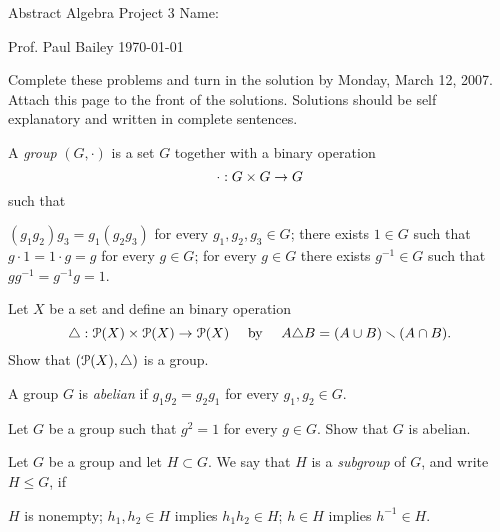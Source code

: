 \documentclass{article}
\begin{document}
{\small {\sc Abstract Algebra}}
\hspace{2 cm}
{\normalsize Project 3}
\hspace{2.4 cm}
{\large Name:}

\noindent
\hspace{2.5 cm}
{\small {\sc Prof. Paul Bailey} }
\hspace{2 cm}
{\normalsize \today}

\vspace{0.5 cm}

Complete these problems and turn in the solution by Monday, March 12, 2007.
Attach this page to the front of the solutions.  Solutions should be self explanatory
and written in complete sentences.

\begin{center}
\end{center}

\begin{Def}
A {\em group} $(G,\cdot)$ is a set $G$ together with a binary operation
\[ \cdot : G \times G \to G \]
such that
\begin{itemize}
 $(g_1 g_2) g_3 = g_1(g_2 g_3)$ for every $g_1,g_2,g_3 \in G$;
 there exists $1 \in G$ such that $g \cdot 1 = 1 \cdot g = g$ for every $g \in G$;
 for every $g \in G$ there exists $g^{-1} \in G$ such that $g g^{-1} = g^{-1} g = 1$.
\end{itemize}
\end{Def}

\begin{Prob}
Let $X$ be a set and define an binary operation
\[ \triangle : \EuScript{P}(X) \times \EuScript{P}(X) \to \EuScript{P}(X) \quad \text{ by } \quad
    A \triangle B = (A \cup B) \smallsetminus (A \cap B) . \]
Show that $(\EuScript{P}(X),\triangle)$ is a group.
\end{Prob}

\begin{Def}
A group $G$ is {\em abelian} if $g_1 g_2 = g_2 g_1$ for every $g_1,g_2 \in G$.
\end{Def}

\begin{Prob}
Let $G$ be a group such that $g^2 = 1$ for every $g \in G$.
Show that $G$ is abelian.
\end{Prob}

\begin{Def}
Let $G$ be a group and let $H \subset G$.  We say that $H$ is a {\em subgroup} of $G$,
and write $H \le G$, if
\begin{itemize}
 $H$ is nonempty;
 $h_1,h_2 \in H$ implies $h_1 h_2 \in H$;
 $h \in H$ implies $h^{-1} \in H$.
\end{itemize}
\end{Def}
\end{document}
